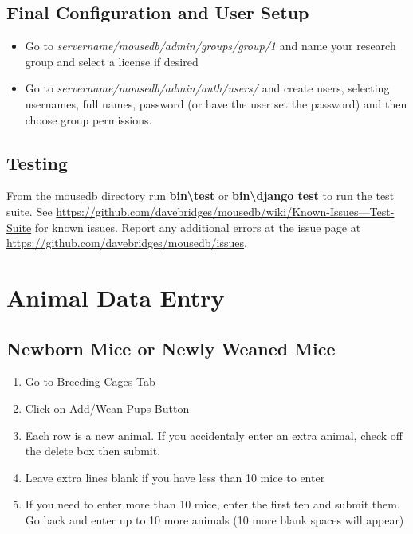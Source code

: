 \documentclass[letterpaper,10pt,english]{sphinxmanual}
\begin{document}
\section{Final Configuration and User Setup}
\label{installation:final-configuration-and-user-setup}\begin{itemize}
\item {} 
Go to \emph{servername/mousedb/admin/groups/group/1} and name your research group and select a license if desired

\item {} 
Go to \emph{servername/mousedb/admin/auth/users/} and create users, selecting usernames, full names, password (or have the user set the password) and then choose group permissions.

\end{itemize}


\section{Testing}
\label{installation:testing}
From the mousedb directory run \textbf{bin\textbackslash{}test} or \textbf{bin\textbackslash{}django test} to run the test suite.  See \href{https://github.com/davebridges/mousedb/wiki/Known-Issues---Test-Suite}{https://github.com/davebridges/mousedb/wiki/Known-Issues---Test-Suite} for known issues.  Report any additional errors at the issue page at \href{https://github.com/davebridges/mousedb/issues}{https://github.com/davebridges/mousedb/issues}.


\chapter{Animal Data Entry}
\label{usage:animal-data-entry}\label{usage::doc}

\section{Newborn Mice or Newly Weaned Mice}
\label{usage:newborn-mice-or-newly-weaned-mice}\begin{enumerate}
\item {} 
Go to Breeding Cages Tab

\item {} 
Click on Add/Wean Pups Button

\item {} 
Each row is a new animal.  If you accidentaly enter an extra animal, check off the delete box then submit.

\item {} 
Leave extra lines blank if you have less than 10 mice to enter

\item {} 
If you need to enter more than 10 mice, enter the first ten and submit them.  Go back and enter up to 10 more animals (10 more blank spaces will appear)

\end{enumerate}
\end{document}
